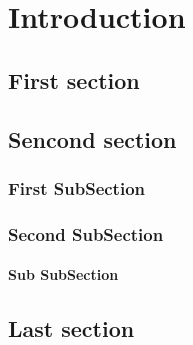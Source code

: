 \chapter{Introduction}
\lipsum[2]
	 
\section{First section}
\lipsum[3]

\section{Sencond  section}
\lipsum[3]
\subsection{First SubSection}
\lipsum[3]
\subsection{Second SubSection}
\lipsum[3]
\subsubsection{Sub SubSection}
\lipsum[3]	 
	 
	 
\section{Last section} 
\lipsum[3]